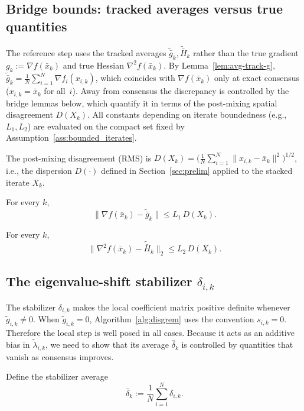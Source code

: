 \documentclass[review,onefignum,onetabnum]{siamart171218}
\begin{document}
	\subsection{Bridge bounds: tracked averages versus true quantities}\label{ssec:bridge}
	The reference step uses the tracked averages
	$\tilde{\bar g}_k,\tilde{\bar H}_k$ rather than the true gradient
	$g_k:=\nabla f(\bar x_k)$ and true Hessian
	$\nabla^2 f(\bar x_k)$.
	By Lemma~\ref{lem:avg-track-g},
	$\tilde{\bar g}_k = \frac{1}{N}\sum_{i=1}^N\nabla f_i(x_{i,k})$,
	which coincides with $\nabla f(\bar x_k)$ only at exact
	consensus ($x_{i,k}=\bar x_k$ for all~$i$).
	Away from consensus the discrepancy is controlled by the
	bridge lemmas below, which quantify it in terms of the
	post-mixing spatial disagreement $D(X_k)$.
	All constants depending on iterate boundedness
	(e.g., $L_1,L_2$) are evaluated on the compact set fixed by
	Assumption~\ref{ass:bounded_iterates}.
	
	The post-mixing disagreement (RMS) is
	$D(X_k)=\bigl(\frac1N\sum_{i=1}^N \|x_{i,k}-\bar x_k\|^2\bigr)^{1/2}$,
	i.e., the dispersion $D(\cdot)$ defined in Section~\ref{sec:prelim}
	applied to the stacked iterate $X_k$.
	
	\begin{lemma}\label{lem:bridge-grad}
		For every $k$,
		\[
		\|\nabla f(\bar x_k)-\tilde{\bar g}_k\|\le L_1\,D(X_k).
		\]
	\end{lemma}
	
	\begin{lemma}\label{lem:bridge-hess}
		For every $k$,
		\[
		\|\nabla^2 f(\bar x_k)-\tilde{\bar H}_k\|_2\le L_2\,D(X_k).
		\]
	\end{lemma}
	
	\subsection{The eigenvalue-shift stabilizer \texorpdfstring{$\delta_{i,k}$}{delta\_ik}}\label{ssec:stab}
	The stabilizer $\delta_{i,k}$ makes the local coefficient matrix
	positive definite whenever $\tilde g_{i,k}\ne0$. When
	$\tilde g_{i,k}=0$, Algorithm~\ref{alg:disgrem} uses the convention
	$s_{i,k}=0$. Therefore the local step is well posed in all cases.
	Because it acts as an additive bias in $\tilde\lambda_{i,k}$, we need
	to show that its average $\bar\delta_k$ is controlled by quantities
	that vanish as consensus improves.
	
	Define the stabilizer average
	\[
	\bar\delta_k:=\frac1N\sum_{i=1}^N \delta_{i,k}.
	\]
	
\end{document}
